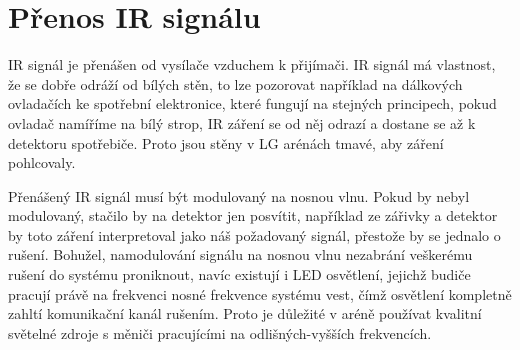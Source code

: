 \section{Přenos IR signálu}
IR signál je přenášen od vysílače vzduchem k přijímači. IR signál má vlastnost, že se dobře odráží od bílých stěn, to lze pozorovat například na dálkových ovladačích ke spotřební elektronice, které fungují na stejných principech, pokud ovladač namíříme na bílý strop, IR záření se od něj odrazí a dostane se až k detektoru spotřebiče. Proto jsou stěny v LG arénách tmavé, aby záření pohlcovaly.

Přenášený IR signál musí být modulovaný na nosnou vlnu. Pokud by nebyl modulovaný, stačilo by na detektor jen posvítit, například ze zářivky a detektor by toto záření interpretoval jako náš požadovaný signál, přestože by se jednalo o rušení. Bohužel, namodulování signálu na nosnou vlnu nezabrání veškerému rušení do systému proniknout, navíc existují i LED osvětlení, jejichž budiče pracují právě na frekvenci nosné frekvence systému vest, čímž osvětlení kompletně zahltí komunikační kanál rušením. Proto je důležité v aréně používat kvalitní světelné zdroje s měniči pracujícími na odlišných-vyšších frekvencích.

